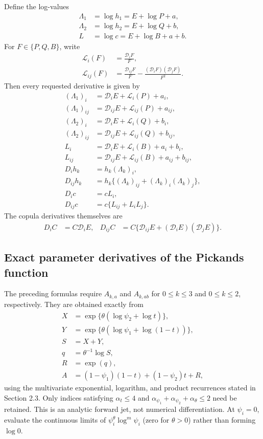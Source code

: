 \documentclass[10pt]{article}
\newcommand{\D}{\mathcal{D}}
\begin{document}
Define the log-values
\begin{align*}
\Lambda_1&=\log h_1=E+\log P+a,\\
\Lambda_2&=\log h_2=E+\log Q+b,\\
L&=\log c=E+\log B+a+b.
\end{align*}
For $F\in\{P,Q,B\}$, write
\begin{align*}
\mathcal{L}_i(F)&=\frac{\D_iF}{F},\\
\mathcal{L}_{ij}(F)&=\frac{\D_{ij}F}{F}
 -\frac{(\D_iF)(\D_jF)}{F^2}.
\end{align*}
Then every requested derivative is given by
\begin{align*}
(\Lambda_1)_i
&=\D_iE+\mathcal{L}_i(P)+a_i,\\
(\Lambda_1)_{ij}
&=\D_{ij}E+\mathcal{L}_{ij}(P)+a_{ij},\\
(\Lambda_2)_i
&=\D_iE+\mathcal{L}_i(Q)+b_i,\\
(\Lambda_2)_{ij}
&=\D_{ij}E+\mathcal{L}_{ij}(Q)+b_{ij},\\
L_i
&=\D_iE+\mathcal{L}_i(B)+a_i+b_i,\\
L_{ij}
&=\D_{ij}E+\mathcal{L}_{ij}(B)+a_{ij}+b_{ij},\\
D_i h_k
&=h_k(\Lambda_k)_i,\\
D_{ij}h_k
&=h_k\{(\Lambda_k)_{ij}+(\Lambda_k)_i(\Lambda_k)_j\},\\
D_i c
&=cL_i,\\
D_{ij}c
&=c\{L_{ij}+L_iL_j\}.
\end{align*}
The copula derivatives themselves are
\begin{align*}
D_iC&=C\D_iE,
&D_{ij}C&=C\{\D_{ij}E+(\D_iE)(\D_jE)\}.
\end{align*}

\subsection{Exact parameter derivatives of the Pickands function}

The preceding formulas require
$A_{k,a}$ and $A_{k,ab}$ for $0\le k\le3$ and $0\le k\le2$,
respectively.  They are obtained exactly from
\begin{align*}
X&=\exp\{\theta(\log\psi_2+\log t)\},\\
Y&=\exp\{\theta(\log\psi_1+\log(1-t))\},\\
S&=X+Y,\\
q&=\theta^{-1}\log S,\\
R&=\exp(q),\\
A&=(1-\psi_1)(1-t)+(1-\psi_2)t+R,
\end{align*}
using the multivariate exponential, logarithm, and product recurrences stated
in Section 2.3.  Only indices satisfying
$\alpha_t\le4$ and
$\alpha_{\psi_1}+\alpha_{\psi_2}+\alpha_\theta\le2$ need be retained.
This is an analytic forward jet, not numerical differentiation.  At
$\psi_i=0$, evaluate the continuous limits of
$\psi_i^\theta\log^m\psi_i$ (zero for $\theta>0$) rather than forming
$\log0$.
\end{document}
